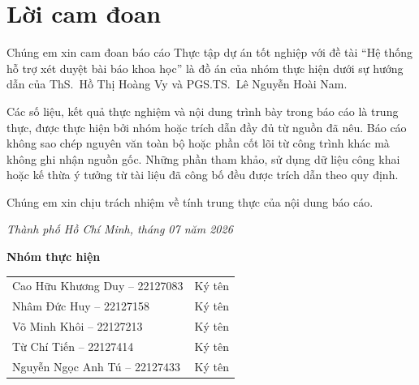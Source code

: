 \chapter*{Lời cam đoan}
\label{commitment}

Chúng em xin cam đoan báo cáo Thực tập dự án tốt nghiệp với đề tài ``Hệ thống hỗ trợ xét duyệt bài báo khoa học'' là đồ án của nhóm thực hiện dưới sự hướng dẫn của ThS.~Hồ Thị Hoàng Vy và PGS.TS.~Lê Nguyễn Hoài Nam.

Các số liệu, kết quả thực nghiệm và nội dung trình bày trong báo cáo là trung thực, được thực hiện bởi nhóm hoặc trích dẫn đầy đủ từ nguồn đã nêu. Báo cáo không sao chép nguyên văn toàn bộ hoặc phần cốt lõi từ công trình khác mà không ghi nhận nguồn gốc. Những phần tham khảo, sử dụng dữ liệu công khai hoặc kế thừa ý tưởng từ tài liệu đã công bố đều được trích dẫn theo quy định.

Chúng em xin chịu trách nhiệm về tính trung thực của nội dung báo cáo.

\vspace{1.5\baselineskip}
\noindent\textit{Thành phố Hồ Chí Minh, tháng 07 năm 2026}

\vspace{1.2\baselineskip}
\noindent\textbf{Nhóm thực hiện}

\vspace{0.8\baselineskip}
\begin{tabular}{@{}p{}p{}@{}}
Cao Hữu Khương Duy -- 22127083 & Ký tên \\[1.4\baselineskip]
Nhâm Đức Huy -- 22127158 & Ký tên \\[1.4\baselineskip]
Võ Minh Khôi -- 22127213 & Ký tên \\[1.4\baselineskip]
Từ Chí Tiến -- 22127414 & Ký tên \\[1.4\baselineskip]
Nguyễn Ngọc Anh Tú -- 22127433 & Ký tên \\
\end{tabular}
